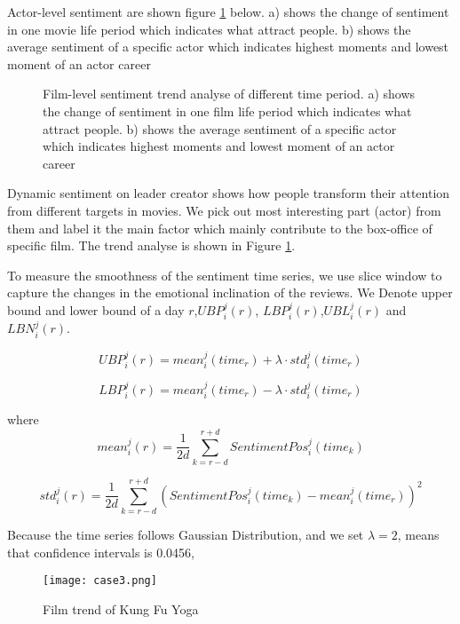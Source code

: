 \par Actor-level sentiment are shown figure \ref{fig:sentiment} below. a) shows the change of sentiment in one movie life period which indicates what attract people. b) shows the average sentiment of a specific actor which indicates highest moments and lowest moment of an actor career

\begin{figure}[!htbp]
\centering
{}
\hfill
{}
\caption{Film-level sentiment trend analyse of different time period. a) shows the change of sentiment in one film life period which indicates what attract people. b) shows the average sentiment of a specific actor which indicates highest moments and lowest moment of an actor career }
\label{fig:sentiment}
\end{figure}

\par Dynamic sentiment on leader creator shows how people transform their attention from different targets in movies. We pick out most interesting part (actor) from them and label it the main factor which mainly contribute to the box-office of specific film. The trend analyse is shown in Figure \ref{fig:sentiment}.

\par To measure the smoothness of the sentiment time series, we use slice window to capture the changes in the emotional inclination of the reviews. We Denote upper bound and lower bound of a day $r$,$UBP^j_i (r)$, $LBP^j_i (r)$,$UBL^j_i (r)$ and $LBN^j_i (r)$.

\begin{equation}
    UBP^j_i (r) = mean^j_i (time_r)+\lambda \cdot std^j_i (time_r)
\end{equation}

\begin{equation}
    LBP^j_i (r) = mean^j_i (time_r)-\lambda \cdot std^j_i (time_r)
\end{equation}

where
\begin{equation}
    mean^j_i (r) = \frac{1}{2d}\sum_{k=r-d}^{r+d}SentimentPos^j_i (time_k)
\end{equation}

\begin{equation}
    std^j_i (r) = \frac{1}{2d}\sum_{k=r-d}^{r+d}(SentimentPos^j_i (time_k)- mean^j_i (time_r))^2
\end{equation}

\par Because the time series follows Gaussian Distribution, and we set $\lambda=2$, means that confidence intervals is 0.0456,

\begin{figure}[!htbp]
\centering
\texttt{[image: case3.png]}
\caption{Film trend of Kung Fu Yoga}
\label{fig:case3}
\end{figure}

